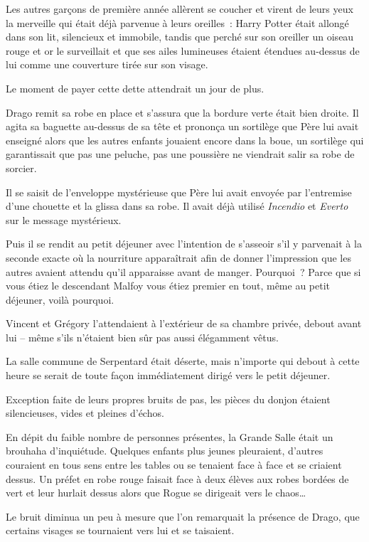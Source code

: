 Les autres garçons de première année allèrent se coucher et virent de leurs yeux la merveille qui était déjà parvenue à leurs oreilles~: Harry Potter était allongé dans son lit, silencieux et immobile, tandis que perché sur son oreiller un oiseau rouge et or le surveillait et que ses ailes lumineuses étaient étendues au-dessus de lui comme une couverture tirée sur son visage.

Le moment de payer cette dette attendrait un jour de plus.


Drago remit sa robe en place et s'assura que la bordure verte était bien droite. Il agita sa baguette au-dessus de sa tête et prononça un sortilège que Père lui avait enseigné alors que les autres enfants jouaient encore dans la boue, un sortilège qui garantissait que pas une peluche, pas une poussière ne viendrait salir sa robe de sorcier.

Il se saisit de l'enveloppe mystérieuse que Père lui avait envoyée par l'entremise d'une chouette et la glissa dans sa robe. Il avait déjà utilisé \emph{Incendio} et \emph{Everto} sur le message mystérieux.

Puis il se rendit au petit déjeuner avec l'intention de s'asseoir s'il y parvenait à la seconde exacte où la nourriture apparaîtrait afin de donner l'impression que les autres avaient attendu qu'il apparaisse avant de manger. Pourquoi~? Parce que si vous étiez le descendant Malfoy vous étiez premier en tout, même au petit déjeuner, voilà pourquoi.

Vincent et Grégory l'attendaient à l'extérieur de sa chambre privée, debout avant lui -- même s'ils n'étaient bien sûr pas aussi élégamment vêtus.

La salle commune de Serpentard était déserte, mais n'importe qui debout à cette heure se serait de toute façon immédiatement dirigé vers le petit déjeuner.

Exception faite de leurs propres bruits de pas, les pièces du donjon étaient silencieuses, vides et pleines d'échos.

En dépit du faible nombre de personnes présentes, la Grande Salle était un brouhaha d'inquiétude. Quelques enfants plus jeunes pleuraient, d'autres couraient en tous sens entre les tables ou se tenaient face à face et se criaient dessus. Un préfet en robe rouge faisait face à deux élèves aux robes bordées de vert et leur hurlait dessus alors que Rogue se dirigeait vers le chaos…

Le bruit diminua un peu à mesure que l'on remarquait la présence de Drago, que certains visages se tournaient vers lui et se taisaient.

